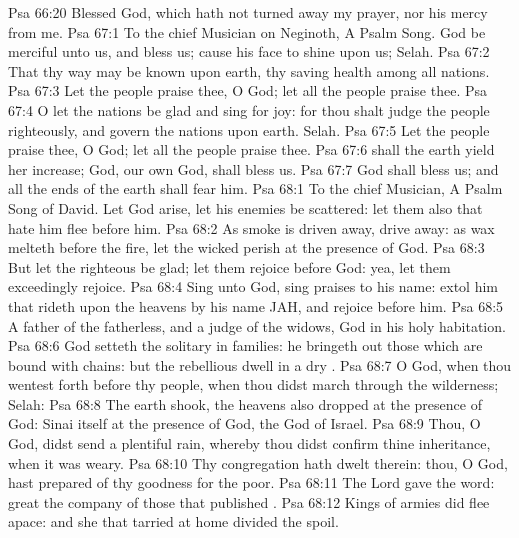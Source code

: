 \vs Psa 66:20 Blessed  God, which hath not turned away my prayer, nor his mercy from me.
\vs Psa 67:1 To the chief Musician on Neginoth, A Psalm  Song. God be merciful unto us, and bless us;  cause his face to shine upon us; Selah.
\vs Psa 67:2 That thy way may be known upon earth, thy saving health among all nations.
\vs Psa 67:3 Let the people praise thee, O God; let all the people praise thee.
\vs Psa 67:4 O let the nations be glad and sing for joy: for thou shalt judge the people righteously, and govern the nations upon earth. Selah.
\vs Psa 67:5 Let the people praise thee, O God; let all the people praise thee.
\vs Psa 67:6  shall the earth yield her increase;  God,  our own God, shall bless us.
\vs Psa 67:7 God shall bless us; and all the ends of the earth shall fear him.
\vs Psa 68:1 To the chief Musician, A Psalm  Song of David. Let God arise, let his enemies be scattered: let them also that hate him flee before him.
\vs Psa 68:2 As smoke is driven away,  drive  away: as wax melteth before the fire,  let the wicked perish at the presence of God.
\vs Psa 68:3 But let the righteous be glad; let them rejoice before God: yea, let them exceedingly rejoice.
\vs Psa 68:4 Sing unto God, sing praises to his name: extol him that rideth upon the heavens by his name JAH, and rejoice before him.
\vs Psa 68:5 A father of the fatherless, and a judge of the widows,  God in his holy habitation.
\vs Psa 68:6 God setteth the solitary in families: he bringeth out those which are bound with chains: but the rebellious dwell in a dry .
\vs Psa 68:7 O God, when thou wentest forth before thy people, when thou didst march through the wilderness; Selah:
\vs Psa 68:8 The earth shook, the heavens also dropped at the presence of God:  Sinai itself  at the presence of God, the God of Israel.
\vs Psa 68:9 Thou, O God, didst send a plentiful rain, whereby thou didst confirm thine inheritance, when it was weary.
\vs Psa 68:10 Thy congregation hath dwelt therein: thou, O God, hast prepared of thy goodness for the poor.
\vs Psa 68:11 The Lord gave the word: great  the company of those that published .
\vs Psa 68:12 Kings of armies did flee apace: and she that tarried at home divided the spoil.
